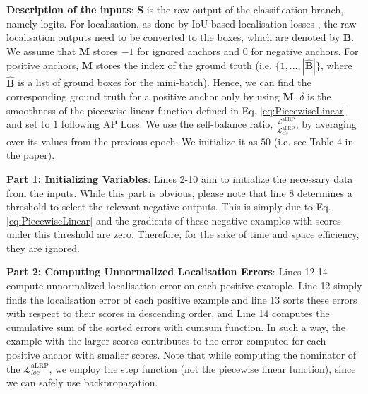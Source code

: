 \documentclass{article}
\begin{document}
\textbf{Description of the inputs}: $\mathbf{S}$ is the raw output of the classification branch, namely logits. For localisation, as done by IoU-based localisation losses \cite{UnitBox,GIoULoss}, the raw localisation outputs need to be converted to the boxes, which are denoted by $\mathbf{B}$. We assume that $\mathbf{M}$ stores $-1$ for ignored anchors and $0$ for negative anchors. For positive anchors, $\mathbf{M}$ stores the index of the ground truth (i.e. $\{1,...,|\mathbf{\hat{B}}|\}$, where $\mathbf{\hat{B}}$ is a list of ground boxes for the mini-batch). Hence, we can find the corresponding ground truth for a positive anchor only by using $\mathbf{M}$. $\delta$ is the smoothness of the piecewise linear function defined in Eq. \ref{eq:PiecewiseLinear} and set to $1$ following AP Loss. We use the self-balance ratio, $\frac{\mathcal{L}^\mathrm{aLRP}}{\mathcal{L}^\mathrm{aLRP}_{cls}}$, by averaging over its values from the previous epoch. We initialize it as $50$ (i.e. see Table 4 in the paper).

\textbf{Part 1: Initializing Variables}: Lines 2-10  aim to initialize the necessary data from the inputs. While this part is obvious, please note that line 8 determines a threshold to select the relevant negative outputs. This is simply due to Eq. \ref{eq:PiecewiseLinear} and the gradients of these negative examples with scores under this threshold are zero. Therefore, for the sake of time and space efficiency, they are ignored.

\textbf{Part 2: Computing Unnormalized Localisation Errors}: Lines 12-14 compute unnormalized localisation error on each positive example. Line 12 simply finds the localisation error of each positive example and line 13 sorts these errors with respect to their scores in descending order, and Line 14 computes the cumulative sum of the sorted errors with $\mathrm{cumsum}$ function. In such a way, the example with the larger scores contributes to the error computed for each positive anchor with smaller scores. Note that while computing the nominator of the $\mathcal{L}^\mathrm{aLRP}_{loc}$, we employ the step function (not the piecewise linear function), since we can safely use backpropagation. 
\end{document}
